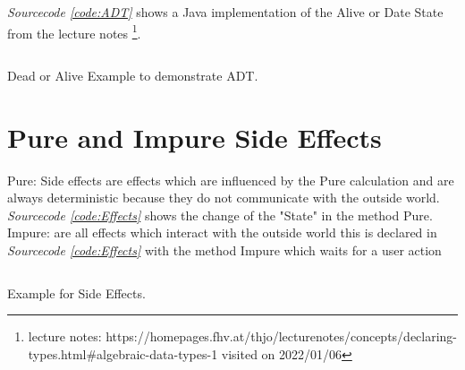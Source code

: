 \documentclass[a4paper,12pt,twoside]{scrreprt}
\begin{document}
\emph{Sourcecode \ref{code:ADT}} shows a Java implementation of the Alive or Date State from the lecture notes \footnote{ lecture notes: https://homepages.fhv.at/thjo/lecturenotes/concepts/declaring-types.html\#algebraic-data-types-1 visited on 2022/01/06}.
\begin{listing}[ht]
    \inputminted[fontsize=\footnotesize,linenos]{java}{./code/ADT.java}
    \caption[Example for a \ac{ADT}]{Dead or Alive Example to demonstrate \ac{ADT}.}
    \label{code:ADT}
\end{listing}
\clearpage


\section{Pure and Impure Side Effects}
Pure: Side effects are effects which are influenced by the Pure calculation and are always deterministic because they do not communicate with the outside world. \emph{Sourcecode \ref{code:Effects}} shows the change of the "State" in the method Pure.
\newline
Impure: are all effects which interact with the outside world this is declared in \emph{Sourcecode \ref{code:Effects}} with the method Impure which waits for a user action
\begin{listing}[ht]
    \inputminted[fontsize=\footnotesize,linenos]{java}{./code/SideEffects.java}
    \caption[Example for Side Effects]{Example for Side Effects.}
    \label{code:Effects}
\end{listing}
\clearpage

\clearpage
{}
{}
\printbibliography
\end{document}
